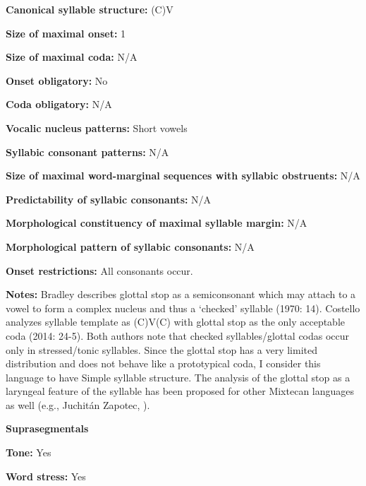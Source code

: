 \textbf{Canonical syllable structure:} (C)V \citep[14]{Bradley1970}



\textbf{Size of maximal onset:} 1



\textbf{Size of maximal coda:} N/A



\textbf{Onset obligatory:} No



\textbf{Coda obligatory:} N/A



\textbf{Vocalic nucleus patterns:} Short vowels



\textbf{Syllabic consonant patterns:} N/A



\textbf{Size of maximal word{}-marginal sequences with syllabic obstruents:} N/A



\textbf{Predictability of syllabic consonants:} N/A



\textbf{Morphological constituency of maximal syllable margin:} N/A



\textbf{Morphological pattern of syllabic consonants:} N/A



\textbf{Onset restrictions:} All consonants occur.



\textbf{Notes:} Bradley describes glottal stop as a semiconsonant which may attach to a vowel to form a complex nucleus and thus a ‘checked’ syllable (1970: 14). Costello analyzes syllable template as (C)V(C) with glottal stop as the only acceptable coda (2014: 24-5). Both authors note that checked syllables/glottal codas occur only in stressed/tonic syllables. Since the glottal stop has a very limited distribution and does not behave like a prototypical coda, I consider this language to have Simple syllable structure. The analysis of the glottal stop as a laryngeal feature of the syllable has been proposed for other Mixtecan languages as well (e.g., Juchitán Zapotec, \citealt{MarlettPickett1987}).



\textbf{Suprasegmentals}



\textbf{Tone:} Yes



\textbf{Word stress:} Yes




